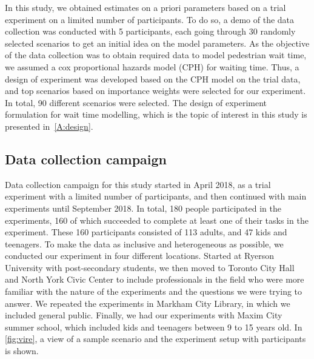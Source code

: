 In this study, we obtained estimates on a priori parameters based on a trial experiment on a limited number of participants. To do so, a demo of the data collection was conducted with 5 participants, each going through 30 randomly selected scenarios to get an initial idea on the model parameters. As the objective of the data collection was to obtain required data to model pedestrian wait time, we assumed a cox proportional hazards model (CPH) for waiting time. Thus, a design of experiment was developed based on the CPH model on the trial data, and top scenarios based on importance weights were selected for our experiment. In total, 90 different scenarios were selected. The design of experiment formulation for wait time modelling, which is the topic of interest in this study is presented in~\cref{A:design}.

\subsection{Data collection campaign}
Data collection campaign for this study started in April 2018, as a trial experiment with a limited number of participants, and then continued with main experiments until September 2018. In total, 180 people participated in the experiments, 160 of which succeeded to complete at least one of their tasks in the experiment. These 160 participants consisted of 113 adults, and 47 kids and teenagers. To make the data as inclusive and heterogeneous as possible, we conducted our experiment in four different locations. Started at Ryerson University with post-secondary students, we then moved to Toronto City Hall and North York Civic Center to include professionals in the field who were more familiar with the nature of the experiments and the questions we were trying to answer. We repeated the experiments in Markham City Library, in which we included general public. Finally, we had our experiments with Maxim City summer school, which included kids and teenagers between 9 to 15 years old. In \cref{fig:vire}, a view of a sample scenario and the experiment setup with participants is shown. 

